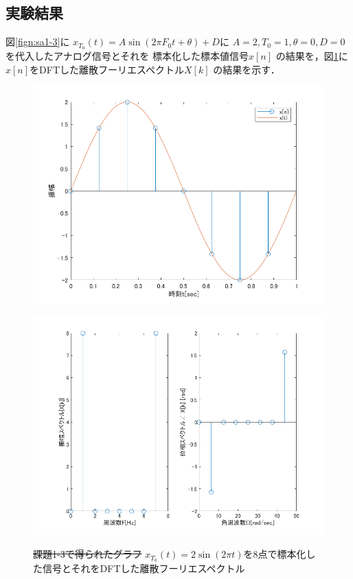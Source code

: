 \documentclass[11pt, a4paper, titlepage]{ltjsarticle}
\begin{document}
\subsection*{実験結果}
図\ref*{fign:sa1-3}に
$x_{T_{0}}(t)=A\sin(2\pi F_{0}t+\theta)+ D$に
$A=2,T_{0}=1,\theta=0,D=0$を代入したアナログ信号とそれを
標本化した標本値信号$x[n]$
の結果を，図\ref*{fign:sp1-3}に
$x[n]$をDFTした離散フーリエスペクトル$X[k]$
の結果を示す．
\begin{figure}[h]
\begin{center}
\begin{minipage}[t]{0.48\columnwidth}
    \includegraphics[width=\columnwidth]{figures/sampling1-3.png}
    \label{fign:sa1-3}
\end{minipage}
\begin{minipage}[t]{0.48\columnwidth}
    \includegraphics[width=\columnwidth]{figures/spectrum1-3.png}
    \label{fign:sp1-3}
\end{minipage}
\end{center}
\caption{\sout{課題1-3で得られたグラフ}
$x_{T_{0}}(t)=2\sin(2\pi t)$を8点で標本化した信号とそれをDFTした離散フーリエスペクトル}
\end{figure}
\end{document}
